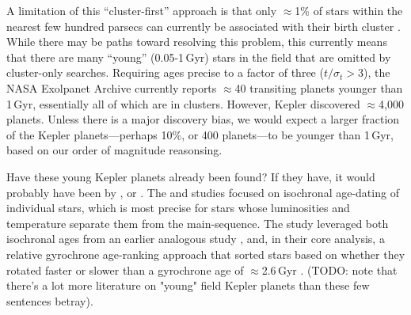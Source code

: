 \documentclass[11pt,twocolumn,tighten]{aastex63}
\begin{document}
A limitation of this ``cluster-first'' approach is that only
$\approx$1\% of stars within the nearest few hundred parsecs can
currently be associated with their birth cluster
\citep[e.g.][]{Zari_2018,CantatGaudin_2020,Kounkel_2020,Kerr_2021}.
While there may be paths toward resolving this problem, this currently
means that there are many ``young'' (0.05-1\,Gyr) stars in the field
that are omitted by cluster-only searches.  Requiring ages precise to
a factor of three ($t/\sigma_t > 3$), the NASA Exolpanet Archive
currently reports $\approx$40 transiting planets younger than 1\,Gyr,
essentially all of which are in clusters.  However, Kepler discovered
$\approx$4{,}000 planets.  Unless there is a major discovery bias, we
would expect a larger fraction of the Kepler planets---perhaps 10\%,
or 400 planets---to be younger than 1\,Gyr, based on our order of
magnitude reasonsing.


Have these young Kepler planets already been found?  If they have, 
it would probably have been by
\citet{Berger_2020b_rpage}, \citet{David_2021} or
\citet{Petigura_2022}.  The \citeauthor{Berger_2020b_rpage} and
\citeauthor{Petigura_2022} studies focused on
isochronal age-dating of individual stars, which is most precise 
for stars whose luminosities and temperature separate them from the
main-sequence.  The \citeauthor{David_2021} study leveraged both isochronal
ages from an earlier analogous study
\citep{Fulton_Petigura_2018_cks_vii}, and, in their core analysis, a
relative gyrochrone age-ranking approach that sorted stars based on
whether they rotated faster or slower than a gyrochrone age of
$\approx$2.6\,Gyr \citep{Meibom_2015,Curtis_2020}.
(TODO: note that there's a lot more literature on "young" field Kepler
planets than these few sentences betray).
\end{document}
